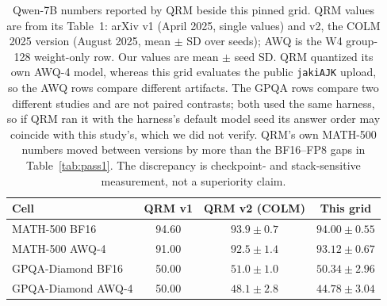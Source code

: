 \documentclass[11pt,a4paper]{article}
\begin{document}
\begin{table}[!htbp]
\centering
\caption{Qwen-7B numbers reported by QRM beside this pinned grid. QRM values are from its Table~1: arXiv v1 (April 2025, single values) and v2, the COLM 2025 version (August 2025, mean $\pm$ SD over seeds); AWQ is the W4 group-128 weight-only row. Our values are mean $\pm$ seed SD. QRM quantized its own AWQ-4 model, whereas this grid evaluates the public \texttt{jakiAJK} upload, so the AWQ rows compare different artifacts. The GPQA rows compare two different studies and are not paired contrasts; both used the same harness, so if QRM ran it with the harness's default model seed its answer order may coincide with this study's, which we did not verify. QRM's own MATH-500 numbers moved between versions by more than the BF16--FP8 gaps in Table~\ref{tab:pass1}. The discrepancy is checkpoint- and stack-sensitive measurement, not a superiority claim.}
\label{tab:qrm-compare}
\small
\begin{tabular}{lccc}
\toprule
\textbf{Cell} & \textbf{QRM v1} & \textbf{QRM v2 (COLM)} & \textbf{This grid} \\
\midrule
MATH-500 BF16 & 94.60 & $93.9\pm 0.7$ & $94.00\pm 0.55$ \\
MATH-500 AWQ-4 & 91.00 & $92.5\pm 1.4$ & $93.12\pm 0.67$ \\
GPQA-Diamond BF16 & 50.00 & $51.0\pm 1.0$ & $50.34\pm 2.96$ \\
GPQA-Diamond AWQ-4 & 50.00 & $48.1\pm 2.8$ & $44.78\pm 3.04$ \\
\bottomrule
\end{tabular}
\end{table}

\FloatBarrier
\end{document}
